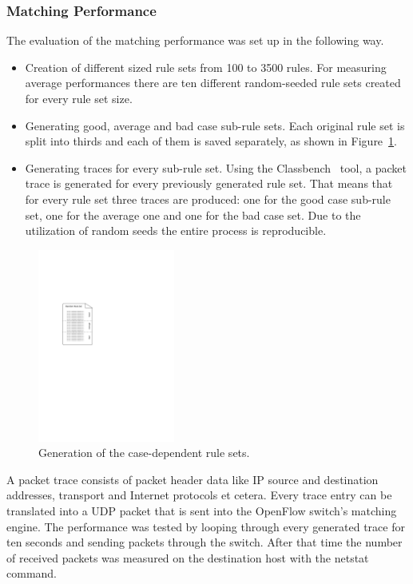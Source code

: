 \documentclass[a4paper,
		12pt,
		parskip=full,
		titlepage
		]{scrartcl}
\begin{document}
\subsubsection{Matching Performance}
The evaluation of the matching performance was set up in the following way.
\begin{itemize}
    \item Creation of different sized rule sets from 100 to 3500 rules.
        For measuring average performances there are ten different random-seeded rule sets created for every rule set size.
    \item Generating good, average and bad case sub-rule sets. 
        Each original rule set is split into thirds and each of them is saved separately, 
        as shown in Figure~\ref{fig:rule-thirds}.
    \item Generating traces for every sub-rule set.
        Using the Classbench~\cite{classbench_website} tool, a packet trace is generated for every previously generated rule set.
        That means that for every rule set three traces are produced: 
        one for the good case sub-rule set, one for the average one and one for the bad case set.
        Due to the utilization of random seeds the entire process is reproducible.
\end{itemize}

\begin{figure}
\centering
\includegraphics[width=0.4\textwidth]{images/rule-thirds}
\caption{Generation of the case-dependent rule sets.}
\label{fig:rule-thirds}
\end{figure}

A packet trace consists of packet header data like IP source and destination addresses, transport and Internet protocols et cetera.
Every trace entry can be translated into a UDP packet that is sent into the OpenFlow switch's matching engine.
The performance was tested by looping through every generated trace for ten seconds and sending packets through the switch.
After that time the number of received packets was measured on the destination host with the \textsf{netstat} command.
\end{document}
